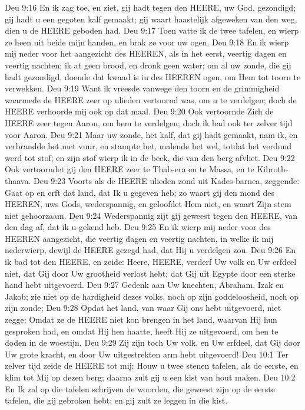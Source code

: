 Deu 9:16  En ik zag toe, en ziet, gij hadt tegen den HEERE, uw God, gezondigd; gij hadt u een gegoten kalf gemaakt; gij waart haastelijk afgeweken van den weg, dien u de HEERE geboden had.
Deu 9:17  Toen vatte ik de twee tafelen, en wierp ze heen uit beide mijn handen, en brak ze voor uw ogen.
Deu 9:18  En ik wierp mij neder voor het aangezicht des HEEREN, als in het eerst, veertig dagen en veertig nachten; ik at geen brood, en dronk geen water; om al uw zonde, die gij hadt gezondigd, doende dat kwaad is in des HEEREN ogen, om Hem tot toorn te verwekken.
Deu 9:19  Want ik vreesde vanwege den toorn en de grimmigheid waarmede de HEERE zeer op ulieden vertoornd was, om u te verdelgen; doch de HEERE verhoorde mij ook op dat maal.
Deu 9:20  Ook vertoornde Zich de HEERE zeer tegen Aaron, om hem te verdelgen; doch ik bad ook ter zelver tijd voor Aaron.
Deu 9:21  Maar uw zonde, het kalf, dat gij hadt gemaakt, nam ik, en verbrandde het met vuur, en stampte het, malende het wel, totdat het verdund werd tot stof; en zijn stof wierp ik in de beek, die van den berg afvliet.
Deu 9:22  Ook vertoorndet gij den HEERE zeer te Thab-era en te Massa, en te Kibroth-thaava.
Deu 9:23  Voorts als de HEERE ulieden zond uit Kades-barnea, zeggende: Gaat op en erft dat land, dat Ik u gegeven heb; zo waart gij den mond des HEEREN, uws Gods, wederspannig, en geloofdet Hem niet, en waart Zijn stem niet gehoorzaam.
Deu 9:24  Wederspannig zijt gij geweest tegen den HEERE, van den dag af, dat ik u gekend heb.
Deu 9:25  En ik wierp mij neder voor des HEEREN aangezicht, die veertig dagen en veertig nachten, in welke ik mij nederwierp, dewijl de HEERE gezegd had, dat Hij u verdelgen zou.
Deu 9:26  En ik bad tot den HEERE, en zeide: Heere, HEERE, verderf Uw volk en Uw erfdeel niet, dat Gij door Uw grootheid verlost hebt; dat Gij uit Egypte door een sterke hand hebt uitgevoerd.
Deu 9:27  Gedenk aan Uw knechten, Abraham, Izak en Jakob; zie niet op de hardigheid dezes volks, noch op zijn goddeloosheid, noch op zijn zonde;
Deu 9:28  Opdat het land, van waar Gij ons hebt uitgevoerd, niet zegge: Omdat ze de HEERE niet kon brengen in het land, waarvan Hij hun gesproken had, en omdat Hij hen haatte, heeft Hij ze uitgevoerd, om hen te doden in de woestijn.
Deu 9:29  Zij zijn toch Uw volk, en Uw erfdeel, dat Gij door Uw grote kracht, en door Uw uitgestrekten arm hebt uitgevoerd!
Deu 10:1  Ter zelver tijd zeide de HEERE tot mij: Houw u twee stenen tafelen, als de eerste, en klim tot Mij op dezen berg; daarna zult gij u een kist van hout maken.
Deu 10:2  En Ik zal op die tafelen schrijven de woorden, die geweest zijn op de eerste tafelen, die gij gebroken hebt; en gij zult ze leggen in die kist.
